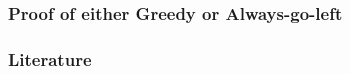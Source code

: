 \documentclass{beamer}
\newcommand\scalefac{0.55}
\newcommand\ballsize{5mm}
\newcommand\nrbins{6}
\newcommand\padding{0.1*\ballsize}
\newcommand\bingap{1.6*\balldiameter}
\newcommand\balldiameter{2*\ballsize}
\newcommand\bin[1]{
	\path node[topflat, xshift=#1*\bingap*\scalefac, above, yshift=-\padding*\scalefac]  {};
}
\newcommand\bins{
	\foreach \ibin in {1,...,\nrbins}
		\bin{\ibin};
}
\newcommand\ball[2]{
	\shade[ballstyle] (#1*\bingap,#2*\balldiameter-\ballsize) circle (\ballsize)
}
\newcommand\putinbin[2]{
	\ifnum #2 > 0
		\foreach \nrballs in {1,...,#2}
 			\ball{#1}{\nrballs};
 	\fi
}
\newcounter{index}
\newcommand\balls[1]{%
	\getargsC{#1}%
  	\setcounter{index}{0}%
  	\whiledo{\theindex < \narg}{%
    		\stepcounter{index}%
    		\putinbin{\theindex}{\csname arg\romannumeral\theindex\endcsname}%
  	}%
}
\newcommand\bab[1]{%
	\bins
	\balls{#1}
}
\begin{document}
\begin{frame}
\frametitle{Proof of either Greedy or Always-go-left}
\end{frame}

\begin{comment}
\section{Test}
\begin{frame}
\frametitle{Ignore the following}
\begin{tikzpicture}[scale=\scalefac]
	\bab{1 2 3 4 5 6}
\end{tikzpicture}
\end{frame}
\end{comment}

\begin{frame}[allowframebreaks]
\frametitle<presentation>{Literature}    
\printbibliography
\end{frame} 	 
\end{document}
